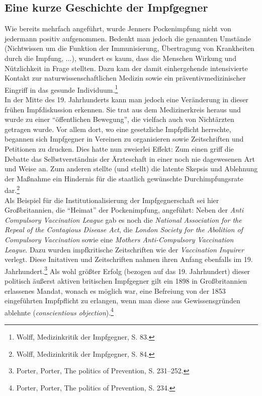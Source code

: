 \documentclass[
    a4paper,
    12pt,
    hyphens,
    chapterprefix=true,
    headheight=33pt,
    footheight=29pt,
    headings=optiontohead, %
]{scrartcl}
\begin{document}
\subsection{Eine kurze Geschichte der Impfgegner}
Wie bereits mehrfach angeführt, wurde Jenners Pockenimpfung nicht von jedermann positiv aufgenommen. Bedenkt man jedoch die genannten Umstände (Nichtwissen um die Funktion der Immunisierung, Übertragung von Krankheiten durch die Impfung, ...), wundert es kaum, dass die Menschen Wirkung und Nützlichkeit in Frage stellten. Dazu kam der damit einhergehende intensivierte Kontakt zur naturwissenschaftlichen Medizin sowie ein präventivmedizinischer Eingriff in das gesunde Individuum.\footnote{Wolff, Medizinkritik der Impfgegner, S. 83.}\\

In der Mitte des 19. Jahrhunderts kann man jedoch eine Veränderung in dieser frühen Impfdiskussion erkennen. Sie trat aus dem Medizinerkreis heraus und wurde zu einer "`öffentlichen Bewegung"', die vielfach auch von Nichtärzten getragen wurde. Vor allem dort, wo eine gesetzliche Impfpflicht herrschte, begannen sich Impfgegner in Vereinen zu organisieren sowie Zeitschriften und Petitionen zu drucken. Dies hatte nun zweierlei Effekt: Zum einen griff die Debatte das Selbstverständnis der Ärzteschaft in einer noch nie dagewesenen Art und Weise an. Zum anderen stellte (und stellt) die latente Skepsis und Ablehnung der Maßnahme ein Hindernis für die staatlich gewünschte Durchimpfungsrate dar.\footnote{Wolff, Medizinkritik der Impfgegner, S. 84.}\\
Als Beispiel für die Institutionalisierung der Impfgegnerschaft sei hier Großbritannien, die "`Heimat"' der Pockenimpfung, angeführt: Neben der \textit{Anti Compulsory Vaccination League} gab es noch die \textit{National Association for the Repeal of the Contagious Disease Act}, die \textit{London Society for the Abolition of Compulsory Vaccination} sowie eine \textit{Mothers Anti-Compulsory Vaccination League}. Dazu wurden impfkritische Zeitschriften wie der \textit{Vaccination Inquirer} verlegt. Diese Initativen und Zeitschriften nahmen ihren Anfang ebenfalls im 19. Jahrhundert.\footnote{Porter, Porter, The politics of Prevention, S. 231--252.} Als wohl größter Erfolg (bezogen auf das 19. Jahrhundert) dieser politisch äußerst aktiven britischen Impfgegner gilt ein 1898 in Großbritannien erlassenes Mandat, wonach es möglich war, eine Befreiung von der 1853 eingeführten Impfpflicht zu erlangen, wenn man diese aus Gewissensgründen ablehnte (\textit{conscientious objection}).\footnote{Porter, Porter, The politics of Prevention, S. 234.}\\
\end{document}
